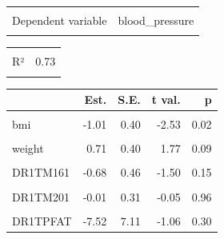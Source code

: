\documentclass[
  letterpaper,
  DIV=11,
  numbers=noendperiod]{scrreport}
\begin{document}
\begin{table}[!h]
\centering
\begin{tabular}{lr}
\toprule
\cellcolor{gray!6}{Observations} & \cellcolor{gray!6}{50}\\
Dependent variable & blood\_pressure\\
\cellcolor{gray!6}{Type} & \cellcolor{gray!6}{OLS linear regression}\\
\bottomrule
\end{tabular}
\end{table} \begin{table}[!h]
\centering
\begin{tabular}{lr}
\toprule
\cellcolor{gray!6}{F(24,25)} & \cellcolor{gray!6}{2.80}\\
R² & 0.73\\
\cellcolor{gray!6}{Adj. R²} & \cellcolor{gray!6}{0.47}\\
\bottomrule
\end{tabular}
\end{table} \begin{table}[!h]
\centering
\begin{threeparttable}
\begin{tabular}{lrrrr}
\toprule
  & Est. & S.E. & t val. & p\\
\midrule
\cellcolor{gray!6}{(Intercept)} & \cellcolor{gray!6}{0.00} & \cellcolor{gray!6}{0.10} & \cellcolor{gray!6}{0.00} & \cellcolor{gray!6}{1.00}\\
bmi & -1.01 & 0.40 & -2.53 & 0.02\\
\cellcolor{gray!6}{waist} & \cellcolor{gray!6}{0.79} & \cellcolor{gray!6}{0.47} & \cellcolor{gray!6}{1.66} & \cellcolor{gray!6}{0.11}\\
weight & 0.71 & 0.40 & 1.77 & 0.09\\
\cellcolor{gray!6}{DR1TMFAT} & \cellcolor{gray!6}{3.17} & \cellcolor{gray!6}{1.21} & \cellcolor{gray!6}{2.62} & \cellcolor{gray!6}{0.01}\\
\addlinespace
DR1TM161 & -0.68 & 0.46 & -1.50 & 0.15\\
\cellcolor{gray!6}{DR1TM181} & \cellcolor{gray!6}{-1.62} & \cellcolor{gray!6}{1.16} & \cellcolor{gray!6}{-1.40} & \cellcolor{gray!6}{0.17}\\
DR1TM201 & -0.01 & 0.31 & -0.05 & 0.96\\
\cellcolor{gray!6}{DR1TM221} & \cellcolor{gray!6}{-0.25} & \cellcolor{gray!6}{0.15} & \cellcolor{gray!6}{-1.65} & \cellcolor{gray!6}{0.11}\\
DR1TPFAT & -7.52 & 7.11 & -1.06 & 0.30\\

\end{tabular}
\end{threeparttable}
\end{table}
\end{document}
